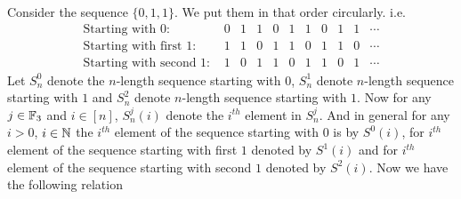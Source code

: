 \documentclass[a4paper, 11pt]{article}
\begin{document}
{Consider the sequence $\{0,1,1\}$. We put them in that order circularly. i.e. $$\begin{array}{lccccccccccc}
\text{Starting with 0: } &        0& 1& 1& 0& 1& 1& 0& 1& 1& \cdots\\
\text{Starting with first 1: } &  1& 1& 0& 1& 1& 0& 1& 1& 0& \cdots\\
\text{Starting with second 1: } & 1& 0& 1& 1& 0& 1& 1& 0& 1& \cdots
\end{array}$$Let $S_n^0$ denote the $n$-length sequence starting with $0$, $S_n^1$ denote $n$-length sequence starting with $1$ and $S_n^2$ denote $n$-length sequence starting with $1$. Now for any $j\in\mathbb{F}_3$ and $i\in[n]$, $S_n^j(i)$ denote the $i^{th}$ element in $S_n^j$. And in general for any $i>0$, $i\in\mathbb{N}$  the $i^{th}$ element of the sequence starting with $0$ is  by $S^0(i)$, for $i^{th}$ element of the sequence starting with first $1$ denoted by $S^1(i)$ and  for $i^{th}$ element of the sequence starting with second $1$ denoted by $S^2(i)$. Now we have the following relation

}
\end{document}
